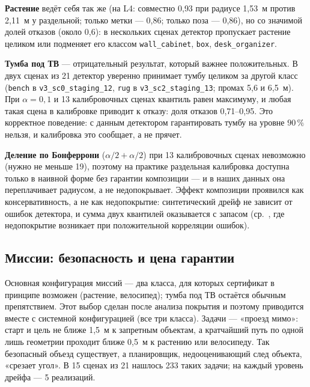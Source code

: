 \textbf{Растение} ведёт себя так же (на L4: совместно 0{,}93 при радиусе 1{,}53~м против 2{,}11~м у раздельной; только метки --- 0{,}86; только поза --- 0{,}86), но со значимой долей отказов (около 0{,}6): в нескольких сценах детектор пропускает растение целиком или подменяет его классом \texttt{wall\_cabinet}, \texttt{box}, \texttt{desk\_organizer}.

\textbf{Тумба под ТВ} --- отрицательный результат, который важнее положительных. В двух сценах из 21 детектор уверенно принимает тумбу целиком за другой класс (\texttt{bench} в \texttt{v3\_sc0\_staging\_12}, \texttt{rug} в \texttt{v3\_sc2\_staging\_13}; промах 5{,}6 и 6{,}5~м). При $\alpha = 0{,}1$ и 13 калибровочных сценах квантиль равен максимуму, и любая такая сцена в калибровке приводит к отказу: доля отказов 0{,}71--0{,}95. Это корректное поведение: с данным детектором гарантировать тумбу на уровне $90\,\%$ нельзя, и калибровка это сообщает, а не прячет.

\textbf{Деление по Бонферрони} ($\alpha/2 + \alpha/2$) при 13 калибровочных сценах невозможно (нужно не меньше 19), поэтому на практике раздельная калибровка доступна только в наивной форме без гарантии композиции --- и в наших данных она переплачивает радиусом, а не недопокрывает. Эффект композиции проявился как консервативность, а не как недопокрытие: синтетический дрейф не зависит от ошибок детектора, и сумма двух квантилей оказывается с запасом (ср.~\cite{baral}, где недопокрытие возникает при положительной корреляции ошибок).

\subsection{Миссии: безопасность и цена гарантии}\label{sec:missions}

Основная конфигурация миссий --- два класса, для которых сертификат в принципе возможен (растение, велосипед); тумба под ТВ остаётся обычным препятствием. Этот выбор сделан после анализа покрытия и поэтому приводится вместе с системной конфигурацией (все три класса). Задачи --- «проезд мимо»: старт и цель не ближе 1{,}5~м к запретным объектам, а кратчайший путь по одной лишь геометрии проходит ближе 0{,}5~м к растению или велосипеду. Так безопасный объезд существует, а планировщик, недооценивающий след объекта, «срезает угол». В 15 сценах из 21 нашлось 233 таких задачи; на каждый уровень дрейфа --- 5 реализаций.

\begin{table}[H]
\centering\small
\caption{Миссии (растение и велосипед): доля задач с найденным путём, доля нарушений среди найденных путей, доля успешных миссий (путь найден, без нарушений и столкновений, цель достигнута)}
\label{tab:missions}

\end{table}

